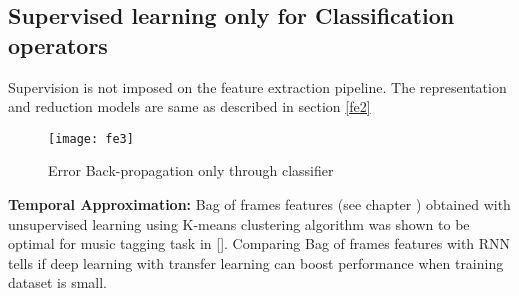 \subsection{Supervised learning only for Classification operators}
\label{fe3}
Supervision is not imposed on the feature extraction pipeline. The representation and reduction models are same as described in section \ref{fe2}
\begin{figure}[h] 
\centering
\texttt{[image: fe3]}
\caption{Error Back-propagation only through classifier }
 \label{fig:fe3}
 \end{figure}
\FloatBarrier 

\noindent \textbf{Temporal Approximation:} Bag of frames features (see chapter ) obtained with unsupervised learning using K-means clustering algorithm was shown to be optimal for music tagging task in []. Comparing Bag of frames features with RNN tells if deep learning with transfer learning can boost performance when training dataset is small. 